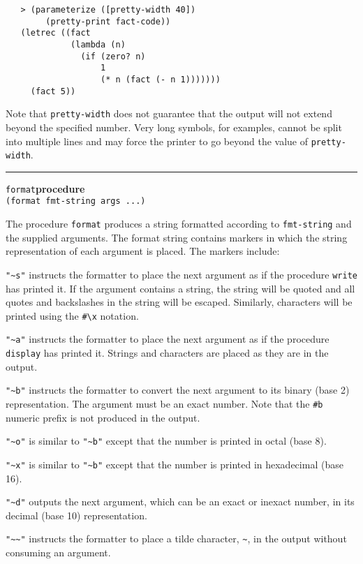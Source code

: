 \documentclass[onecolumn, 12pt, twoside, openright, dvipdfm]{book}
\makeatletter
\newcommand{\idxlabeldefun}[5]{
\vspace{1ex}
\rule{\textwidth}{2pt}
{\phantomsection\index{#1@\texttt{#2}}\label{#3}{\Large\texttt{#4}}\hfill\textbf{#5}}\\}
\newcommand{\idxdefun}[3]{\idxlabeldefun{#1}{#2}{#1}{#2}{#3}}
\newcommand{\defun}[2]{\idxdefun{#1}{#1}{#2}}
\makeatother
\begin{document}
\begin{verbatim}
   > (parameterize ([pretty-width 40])
        (pretty-print fact-code))
   (letrec ((fact
             (lambda (n)
               (if (zero? n)
                   1
                   (* n (fact (- n 1)))))))
     (fact 5))
\end{verbatim}

Note that \texttt{pretty-width} does not guarantee that 
the output will not extend beyond the specified number.  Very long
symbols, for examples, cannot be split into multiple lines and may
force the printer to go beyond the value of \texttt{pretty-width}.

\defun{format}{procedure}
\texttt{(format fmt-string args ...)}

The procedure \texttt{format} produces a string formatted according
to \texttt{fmt-string} and the supplied
arguments.  The format string contains markers in which the string
representation of each argument is placed.  The markers include:


\verb|"~s"| instructs the formatter to place the next argument
as if the procedure \texttt{write} has printed it.  If the argument
contains a string, the string will be quoted and all quotes and
backslashes in the string will be escaped.  Similarly, characters
will be printed using the \verb|#\x| notation.

\verb|"~a"| instructs the formatter to place the next argument
as if the procedure \texttt{display} has printed it.  Strings and
characters are placed as they are in the output.

\verb|"~b"| instructs the formatter to convert the next
argument to its binary (base 2) representation.  The argument must be an
exact number.  Note that the \texttt{\#b} numeric prefix is not
produced in the output.

\verb|"~o"| is similar to \verb|"~b"|  except that
the number is printed in octal (base 8).

\verb|"~x"|  is similar to \verb|"~b"|  except that
the number is printed in hexadecimal (base 16).

\verb|"~d"|  outputs the next argument, which can be an
exact or inexact number, in its decimal (base 10) representation.

\verb|"~~"|  instructs the formatter to place a tilde
character, \verb|~|, in the output without consuming an
argument.
\end{document}
